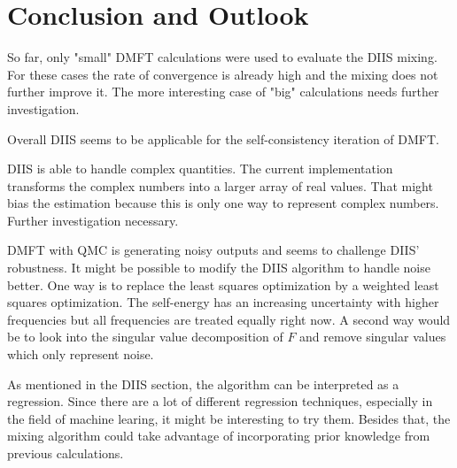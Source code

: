 \chapter{Conclusion and Outlook}
\label{ch:conclusion_outlook}
So far, only "small" DMFT calculations were used to evaluate the DIIS mixing. For these cases the rate of convergence is already high and the mixing does not further improve it. The more interesting case of "big" calculations needs further investigation.

Overall DIIS seems to be applicable for the self-consistency iteration of DMFT.

DIIS is able to handle complex quantities. The current implementation transforms the complex numbers into a larger array of real values. That might bias the estimation because this is only one way to represent complex numbers. Further investigation necessary.

DMFT with QMC is generating noisy outputs and seems to challenge DIIS' robustness. It might be possible to modify the DIIS algorithm to handle noise better. One way is to replace the least squares optimization by a weighted least squares optimization. The self-energy has an increasing uncertainty with higher frequencies but all frequencies are treated equally right now. A second way would be to look into the singular value decomposition of $F$ and remove singular values which only represent noise.

As mentioned in the DIIS section, the algorithm can be interpreted as a regression. Since there are a lot of different regression techniques, especially in the field of machine learing, it might be interesting to try them. Besides that, the mixing algorithm could take advantage of incorporating prior knowledge from previous calculations.

